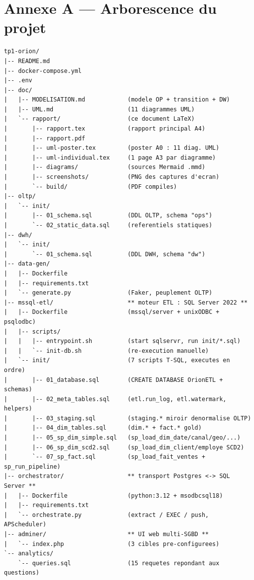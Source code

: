 \documentclass[11pt,a4paper]{article}
\newcounter{question}
\begin{document}
\newpage
\section*{Annexe A --- Arborescence du projet}

\begin{lstlisting}[style=base,basicstyle=\ttfamily\scriptsize]
tp1-orion/
|-- README.md
|-- docker-compose.yml
|-- .env
|-- doc/
|   |-- MODELISATION.md            (modele OP + transition + DW)
|   |-- UML.md                     (11 diagrammes UML)
|   `-- rapport/                   (ce document LaTeX)
|       |-- rapport.tex            (rapport principal A4)
|       |-- rapport.pdf
|       |-- uml-poster.tex         (poster A0 : 11 diag. UML)
|       |-- uml-individual.tex     (1 page A3 par diagramme)
|       |-- diagrams/              (sources Mermaid .mmd)
|       |-- screenshots/           (PNG des captures d'ecran)
|       `-- build/                 (PDF compiles)
|-- oltp/
|   `-- init/
|       |-- 01_schema.sql          (DDL OLTP, schema "ops")
|       `-- 02_static_data.sql     (referentiels statiques)
|-- dwh/
|   `-- init/
|       `-- 01_schema.sql          (DDL DWH, schema "dw")
|-- data-gen/
|   |-- Dockerfile
|   |-- requirements.txt
|   `-- generate.py                (Faker, peuplement OLTP)
|-- mssql-etl/                     ** moteur ETL : SQL Server 2022 **
|   |-- Dockerfile                 (mssql/server + unixODBC + psqlodbc)
|   |-- scripts/
|   |   |-- entrypoint.sh          (start sqlservr, run init/*.sql)
|   |   `-- init-db.sh             (re-execution manuelle)
|   `-- init/                      (7 scripts T-SQL, executes en ordre)
|       |-- 01_database.sql        (CREATE DATABASE OrionETL + schemas)
|       |-- 02_meta_tables.sql     (etl.run_log, etl.watermark, helpers)
|       |-- 03_staging.sql         (staging.* miroir denormalise OLTP)
|       |-- 04_dim_tables.sql      (dim.* + fact.* gold)
|       |-- 05_sp_dim_simple.sql   (sp_load_dim_date/canal/geo/...)
|       |-- 06_sp_dim_scd2.sql     (sp_load_dim_client/employe SCD2)
|       `-- 07_sp_fact.sql         (sp_load_fait_ventes + sp_run_pipeline)
|-- orchestrator/                  ** transport Postgres <-> SQL Server **
|   |-- Dockerfile                 (python:3.12 + msodbcsql18)
|   |-- requirements.txt
|   `-- orchestrate.py             (extract / EXEC / push, APScheduler)
|-- adminer/                       ** UI web multi-SGBD **
|   `-- index.php                  (3 cibles pre-configurees)
`-- analytics/
    `-- queries.sql                (15 requetes repondant aux questions)
\end{lstlisting}
\end{document}
